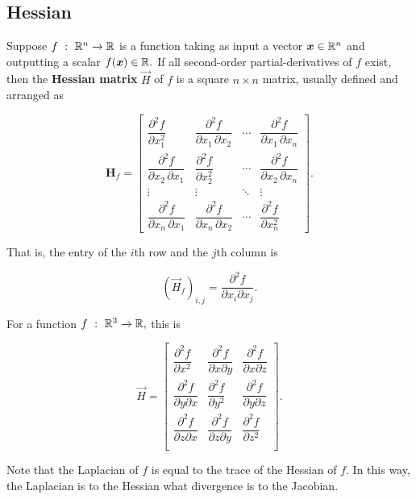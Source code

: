 \documentclass{article}
\begin{document}
\subsection{Hessian}

\begin{definition}
Suppose $f ~ : ~ \mathbb{R}^n \to \mathbb{R}$ is a \@{function} taking as input a \@{vector} $\boldsymbol{x} \in \mathbb{R}^n$ and outputting a \@{scalar} $f(\boldsymbol{x}) \in \mathbb{R}.$ If all second-order \@{partial-derivatives} of $f$ exist, then the \textbf{Hessian matrix} $\vec{H}$ of $f$ is a square $n \times n$ \@{matrix}, usually defined and arranged as 

\[ \mathbf H_f= \begin{bmatrix}
  \dfrac{\partial^2 f}{\partial x_1^2} & \dfrac{\partial^2 f}{\partial x_1\,\partial x_2} & \cdots & \dfrac{\partial^2 f}{\partial x_1\,\partial x_n} \\[2.2ex]
  \dfrac{\partial^2 f}{\partial x_2\,\partial x_1} & \dfrac{\partial^2 f}{\partial x_2^2} & \cdots & \dfrac{\partial^2 f}{\partial x_2\,\partial x_n} \\[2.2ex]
  \vdots & \vdots & \ddots & \vdots \\[2.2ex]
  \dfrac{\partial^2 f}{\partial x_n\,\partial x_1} & \dfrac{\partial^2 f}{\partial x_n\,\partial x_2} & \cdots & \dfrac{\partial^2 f}{\partial x_n^2}
\end{bmatrix}. \]

That is, the \@{entry} of the $i$th row and the $j$th column is

\[ (\vec{H}_f)_{i,j} = \frac{\partial^2 f}{\partial x_i \partial x_j}. \]

For a \@{function} $f ~ : ~ \mathbb{R}^3 \to \mathbb{R},$ this is

\[ \vec{H} =
\begin{bmatrix}
    \dfrac{\partial^2 f}{\partial x^2} & \dfrac{\partial^2 f}{\partial x \partial y} & \dfrac{\partial^2 f}{\partial x \partial z}\\
    \dfrac{\partial^2 f}{\partial y \partial x} & \dfrac{\partial^2 f}{\partial y^2} & \dfrac{\partial^2 f}{\partial y \partial z}\\
    \dfrac{\partial^2 f}{\partial z \partial x} & \dfrac{\partial^2 f}{\partial z \partial y} & \dfrac{\partial^2 f}{\partial z^2}\\
\end{bmatrix}. \]
\end{definition}

Note that the \@{Laplacian} of $f$ is equal to the \@{trace} of the \@{Hessian} of $f.$ In this way, the \@{Laplacian} is to the \@{Hessian} what \@{divergence} is to the \@{Jacobian}. 
\end{document}
